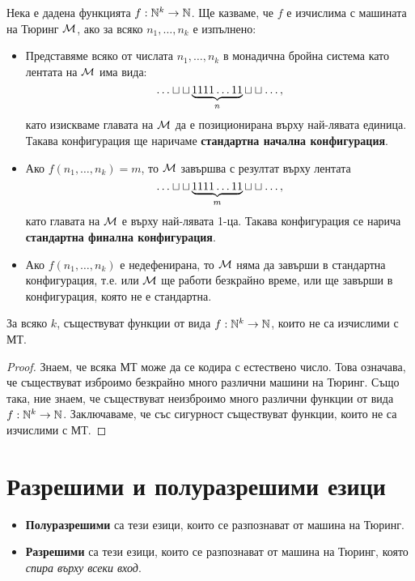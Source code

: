 Нека е дадена функцията $f:\mathbb{N}^k \to \mathbb{N}$.
Ще казваме, че $f$ е изчислима с машината на Тюринг $\mathcal{M}$,
ако за всяко $n_1,\dots,n_k$ е изпълнено:
\begin{itemize}
\item 
  Представяме всяко от числата $n_1,\dots,n_k$ в монадична бройна система
  като лентата на $\mathcal{M}$ има вида:  
  \[\dots \blank \blank \underbrace{1111\dots 11}_{n} \blank\blank\dots,\]
  като изискваме главата на $\mathcal{M}$ да е позиционирана върху най-лявата единица.
  Такава конфигурация ще наричаме {\bf стандартна начална конфигурация}.
\item
  Ако $f(n_1,\dots,n_k) = m$, то $\mathcal{M}$ завършва с резултат върху лентата
  \[\dots \blank \blank \underbrace{1111\dots 11}_{m} \blank\blank\dots,\]
  като главата на $\mathcal{M}$ е върху най-лявата 1-ца.
  Такава конфигурация се нарича {\bf стандартна финална конфигурация}.
\item
  Ако $f(n_1,\dots,n_k)$ е недефенирана, то $\mathcal{M}$ няма да завърши в стандартна конфигурация, т.е.
  или $\mathcal{M}$ ще работи безкрайно време, или ще завърши в конфигурация, която не е стандартна.
\end{itemize}


\begin{thm}
  За всяко $k$, съществуват функции от вида $f:\mathbb{N}^k\to\mathbb{N}$, които не са изчислими с МТ.
\end{thm}
\begin{proof}
  Знаем, че всяка МТ може да се кодира с естествено число.
  Това означава, че съществуват изброимо безкрайно много различни машини на Тюринг.
  Също така, ние знаем, че съществуват неизброимо много различни функции от вида $f:\mathbb{N}^k\to\mathbb{N}$.
  Заключаваме, че със сигурност съществуват функции, които не са изчислими с МТ.
\end{proof}



\section{Разрешими и полуразрешими езици}

\begin{itemize}
\item
  {\bf Полуразрешими} са тези езици, които се разпознават от машина на Тюринг.
\item
  {\bf Разрешими} са тези езици, които се разпознават от машина на Тюринг, която {\em спира върху всеки вход}.
\end{itemize}

